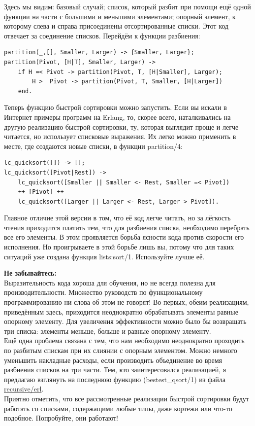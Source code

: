 \documentclass[a4paper,12pt]{report}
\newcommand{\ops}{\colorbox{lgreen}}
\begin{document}
Здесь мы видим: базовый случай; список, который разбит при помощи ещё одной функции на части с большими и меньшими элементами; опорный элемент, к которому слева и справа присоединены отсортированные списки. Этот код отвечает за соединение списков. Перейдём к функции разбиения:
\begin{lstlisting}[style=erlang]
partition(_,[], Smaller, Larger) -> {Smaller, Larger};
partition(Pivot, [H|T], Smaller, Larger) ->
    if H =< Pivot -> partition(Pivot, T, [H|Smaller], Larger);
        H >  Pivot -> partition(Pivot, T, Smaller, [H|Larger])
    end.
\end{lstlisting}

Теперь функцию быстрой сортировки можно запустить. Если вы искали в Интернет примеры программ на Erlang, то, скорее всего, наталкивались на другую реализацию быстрой сортировки, ту, которая выглядит проще и легче читается, но использует списковые выражения. Их легко можно применить в месте, где создаются новые списки, в функции \ops{partition/4}:
\begin{lstlisting}[style=erlang]
lc_quicksort([]) -> [];
lc_quicksort([Pivot|Rest]) ->
    lc_quicksort([Smaller || Smaller <- Rest, Smaller =< Pivot])
    ++ [Pivot] ++
    lc_quicksort([Larger || Larger <- Rest, Larger > Pivot]).
\end{lstlisting}

Главное отличие этой версии в том, что её код легче читать, но за лёгкость чтения приходится платить тем, что для разбиения списка, необходимо перебрать все его элементы. В этом проявляется борьба ясности кода против скорости его исполнения. Но проигрываете в этой борьбе лишь вы, потому что для таких ситуаций уже создана функция \ops{lists:sort/1}. Используйте лучше её.\\
\colorbox{lorange}
{
    \begin{minipage}{1.0\linewidth}
\textbf{Не забывайтесь:}\\
Выразительность кода хороша для обучения, но не всегда полезна для производительности. Множество руководств по функциональному программированию ни слова об этом не говорят! Во\--первых, обеим реализациям, приведённым здесь, приходится неоднократно обрабатывать элементы равные опорному элементу. Для увеличения эффективности можно было бы возвращать три списка: элементы меньше, больше и равные опорному элементу.\\
Ещё одна проблема связана с тем, что нам необходимо неоднократно проходить по разбитым спискам при их слиянии с опорным элементом. Можно немного уменьшить накладные расходы, если производить объединение во время разбиения списков на три части. Тем, кто заинтересовался реализацией, я предлагаю взглянуть на последнюю функцию (\ops{bestest\_qsort/1}) из файла \href{http://learnyousomeerlang.com/static/erlang/recursive.erl}{recursive/erl}.\\
Приятно отметить, что все рассмотренные реализации быстрой сортировки будут работать со списками, содержащими любые типы, даже кортежи или что\--то подобное. Попробуйте, они работают!
    \end{minipage}
}
\end{document}
